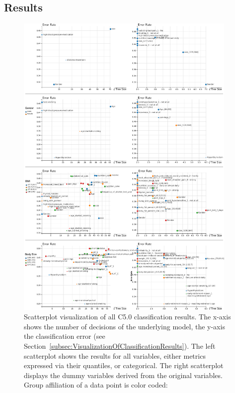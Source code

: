\documentclass[a4paper,twoside]{style/article}
\begin{document}
\subsection{Results}
\begin{figure}[p!]
  \centering
  \includegraphics[width=0.95\textwidth]{figures/results}
  \caption{
Scatterplot visualization of all C5.0 classification results.
The x-axis shows the number of decisions of the underlying model, the y-axis the classification error (see Section~\ref{subsec:VisualizationOfClassificationResults}).
The left scatterplot shows the results for all variables, either metrics expressed via their quantiles, or categorical.
The right scatterplot displays the dummy variables derived from the original variables.
Group affiliation of a data point is color coded:
}
\end{figure}
\end{document}
